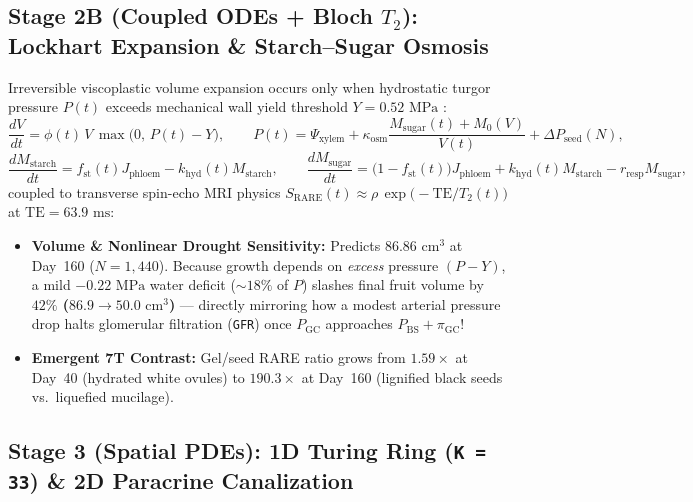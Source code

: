 \documentclass[10.5pt,a4paper]{article}
\begin{document}
\subsection{Stage 2B (Coupled ODEs + Bloch $T_2$): Lockhart Expansion \& Starch--Sugar Osmosis}

Irreversible viscoplastic volume expansion occurs only when hydrostatic turgor pressure $P(t)$ exceeds mechanical wall yield threshold $Y = 0.52\text{ MPa}$ \cite{lockhart1965,hall2013}:
\begin{equation}
    \frac{dV}{dt} = \phi(t)\,V\,\max\!\big(0,\, P(t) - Y\big), \qquad P(t) = \Psi_{\text{xylem}} + \kappa_{\text{osm}}\frac{M_{\text{sugar}}(t) + M_0(V)}{V(t)} + \Delta P_{\text{seed}}(N),
\end{equation}
\begin{equation}
    \frac{dM_{\text{starch}}}{dt} = f_{\text{st}}(t)J_{\text{phloem}} - k_{\text{hyd}}(t)M_{\text{starch}}, \qquad \frac{dM_{\text{sugar}}}{dt} = \big(1 - f_{\text{st}}(t)\big)J_{\text{phloem}} + k_{\text{hyd}}(t)M_{\text{starch}} - r_{\text{resp}}M_{\text{sugar}},
\end{equation}
coupled to transverse spin-echo MRI physics $S_{\text{RARE}}(t) \approx \rho\,\exp\!\big(-\text{TE}/T_2(t)\big)$ at $\text{TE}=63.9\text{ ms}$:
\begin{itemize}
    \item \textbf{Volume \& Nonlinear Drought Sensitivity:} Predicts \textbf{$86.86\text{ cm}^3$} at Day~160 ($N=1{,}440$). Because growth depends on \emph{excess} pressure $(P - Y)$, a mild $-0.22\text{ MPa}$ water deficit ($\sim 18\%$ of $P$) slashes final fruit volume by \textbf{$42\%$ ($86.9 \to 50.0\text{ cm}^3$)} --- directly mirroring how a modest arterial pressure drop halts glomerular filtration (\texttt{GFR}) once $P_{\text{GC}}$ approaches $P_{\text{BS}} + \pi_{\text{GC}}$!
    \item \textbf{Emergent 7T Contrast:} Gel/seed RARE ratio grows from \textbf{$1.59\times$} at Day~40 (hydrated white ovules) to \textbf{$190.3\times$} at Day~160 (lignified black seeds vs.\ liquefied mucilage).
\end{itemize}

\subsection{Stage 3 (Spatial PDEs): 1D Turing Ring (\texttt{K = 33}) \& 2D Paracrine Canalization}
\end{document}
